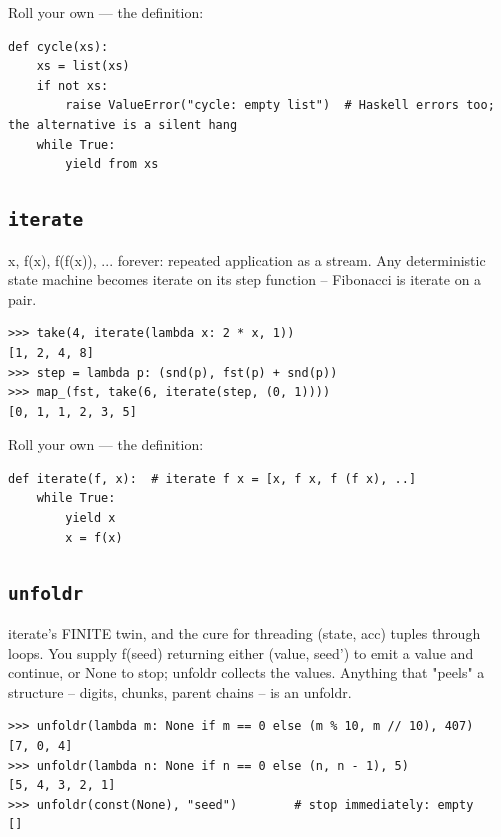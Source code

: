 \documentclass[10pt,letterpaper]{book}
\begin{document}
Roll your own --- the definition:

\begin{lstlisting}[style=ex]
def cycle(xs):
    xs = list(xs)
    if not xs:
        raise ValueError("cycle: empty list")  # Haskell errors too; the alternative is a silent hang
    while True:
        yield from xs
\end{lstlisting}

\subsection{\texttt{iterate}}\label{def:iterate}
x, f(x), f(f(x)), ... forever: repeated application as a stream. Any deterministic state machine becomes iterate on its step function -- Fibonacci is iterate on a pair.
\begin{lstlisting}[style=ex]
>>> take(4, iterate(lambda x: 2 * x, 1))
[1, 2, 4, 8]
>>> step = lambda p: (snd(p), fst(p) + snd(p))
>>> map_(fst, take(6, iterate(step, (0, 1))))
[0, 1, 1, 2, 3, 5]
\end{lstlisting}

Roll your own --- the definition:

\begin{lstlisting}[style=ex]
def iterate(f, x):  # iterate f x = [x, f x, f (f x), ..]
    while True:
        yield x
        x = f(x)
\end{lstlisting}

\subsection{\texttt{unfoldr}}\label{def:unfoldr}
iterate's FINITE twin, and the cure for threading (state, acc) tuples through loops. You supply f(seed) returning either (value, seed') to emit a value and continue, or None to stop; unfoldr collects the values. Anything that "peels" a structure -- digits, chunks, parent chains -- is an unfoldr.
\begin{lstlisting}[style=ex]
>>> unfoldr(lambda m: None if m == 0 else (m % 10, m // 10), 407)
[7, 0, 4]
>>> unfoldr(lambda n: None if n == 0 else (n, n - 1), 5)
[5, 4, 3, 2, 1]
>>> unfoldr(const(None), "seed")        # stop immediately: empty
[]
\end{lstlisting}
\end{document}

